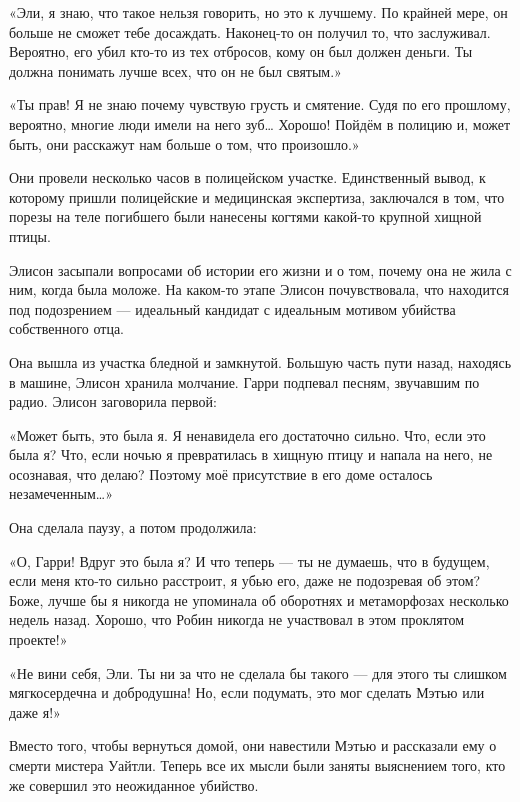 \documentclass[a4paper,12pt]{book}
\begin{document}
«Эли, я знаю, что такое нельзя говорить, но это к лучшему. По крайней мере, он больше не сможет тебе досаждать. Наконец-то он получил то, что заслуживал. Вероятно, его убил кто-то из тех отбросов, кому он был должен деньги. Ты должна понимать лучше всех, что он не был святым.»
\par
«Ты прав! Я не знаю почему чувствую грусть и смятение. Судя по его прошлому, вероятно, многие люди имели на него зуб… Хорошо! Пойдём в полицию и, может быть, они расскажут нам больше о том, что произошло.»
\par
Они провели несколько часов в полицейском участке. Единственный вывод, к которому пришли полицейские и медицинская экспертиза, заключался в том, что порезы на теле погибшего были нанесены когтями какой-то крупной хищной птицы.
\par
Элисон засыпали вопросами об истории его жизни и о том, почему она не жила с ним, когда была моложе. На каком-то этапе Элисон почувствовала, что находится под подозрением — идеальный кандидат с идеальным мотивом убийства собственного отца.\\
\par
Она вышла из участка бледной и замкнутой. Большую часть пути назад, находясь в машине, Элисон хранила молчание. Гарри подпевал песням, звучавшим по радио. Элисон заговорила первой:
\par
«Может быть, это была я. Я ненавидела его достаточно сильно. Что, если это была я? Что, если ночью я превратилась в хищную птицу и напала на него, не осознавая, что делаю? Поэтому моё присутствие в его доме осталось незамеченным…»
\par
Она сделала паузу, а потом продолжила:
\par
«О, Гарри! Вдруг это была я? И что теперь — ты не думаешь, что в будущем, если меня кто-то сильно расстроит, я убью его, даже не подозревая об этом? Боже, лучше бы я никогда не упоминала об оборотнях и метаморфозах несколько недель назад. Хорошо, что Робин никогда не участвовал в этом проклятом проекте!»
\par
«Не вини себя, Эли. Ты ни за что не сделала бы такого — для этого ты слишком мягкосердечна и добродушна! Но, если подумать, это мог сделать Мэтью или даже я!»
\par
Вместо того, чтобы вернуться домой, они навестили Мэтью и рассказали ему о смерти мистера Уайтли. Теперь все их мысли были заняты выяснением того, кто же совершил это неожиданное убийство.
\end{document}

